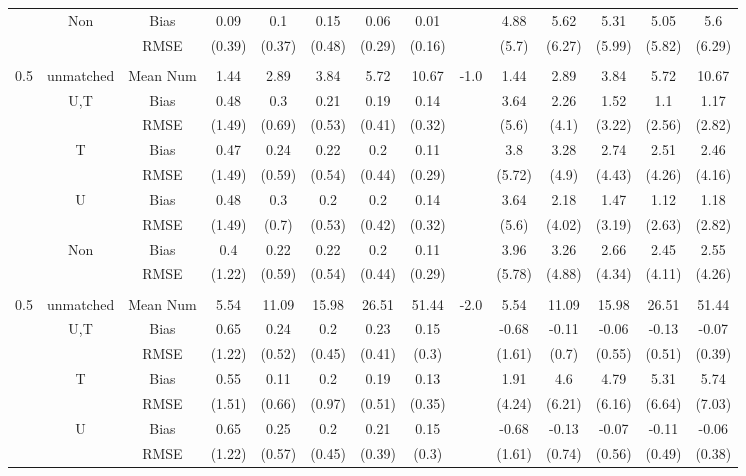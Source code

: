 \begin{tabular}{@{\extracolsep{5pt}}lc|cccccc|lccccc}
 & Non & Bias & 0.09 & 0.1 & 0.15 & 0.06 & 0.01 &  & 4.88 & 5.62 & 5.31 & 5.05 & 5.6 \\
 &  & RMSE & (0.39) & (0.37) & (0.48) & (0.29) & (0.16) &  & (5.7) & (6.27) & (5.99) & (5.82) & (6.29) \\
 &  &  &  &  &  &  &  &  &  &  &  &  &  \\
0.5 & unmatched & Mean Num & 1.44 & 2.89 & 3.84 & 5.72 & 10.67 & -1.0 & 1.44 & 2.89 & 3.84 & 5.72 & 10.67 \\
 & U,T & Bias & 0.48 & 0.3 & 0.21 & 0.19 & 0.14 &  & 3.64 & 2.26 & 1.52 & 1.1 & 1.17 \\
 &  & RMSE & (1.49) & (0.69) & (0.53) & (0.41) & (0.32) &  & (5.6) & (4.1) & (3.22) & (2.56) & (2.82) \\
 & T & Bias & 0.47 & 0.24 & 0.22 & 0.2 & 0.11 &  & 3.8 & 3.28 & 2.74 & 2.51 & 2.46 \\
 &  & RMSE & (1.49) & (0.59) & (0.54) & (0.44) & (0.29) &  & (5.72) & (4.9) & (4.43) & (4.26) & (4.16) \\
 & U & Bias & 0.48 & 0.3 & 0.2 & 0.2 & 0.14 &  & 3.64 & 2.18 & 1.47 & 1.12 & 1.18 \\
 &  & RMSE & (1.49) & (0.7) & (0.53) & (0.42) & (0.32) &  & (5.6) & (4.02) & (3.19) & (2.63) & (2.82) \\
 & Non & Bias & 0.4 & 0.22 & 0.22 & 0.2 & 0.11 &  & 3.96 & 3.26 & 2.66 & 2.45 & 2.55 \\
 &  & RMSE & (1.22) & (0.59) & (0.54) & (0.44) & (0.29) &  & (5.78) & (4.88) & (4.34) & (4.11) & (4.26) \\
 &  &  &  &  &  &  &  &  &  &  &  &  &  \\
0.5 & unmatched & Mean Num & 5.54 & 11.09 & 15.98 & 26.51 & 51.44 & -2.0 & 5.54 & 11.09 & 15.98 & 26.51 & 51.44 \\
 & U,T & Bias & 0.65 & 0.24 & 0.2 & 0.23 & 0.15 &  & -0.68 & -0.11 & -0.06 & -0.13 & -0.07 \\
 &  & RMSE & (1.22) & (0.52) & (0.45) & (0.41) & (0.3) &  & (1.61) & (0.7) & (0.55) & (0.51) & (0.39) \\
 & T & Bias & 0.55 & 0.11 & 0.2 & 0.19 & 0.13 &  & 1.91 & 4.6 & 4.79 & 5.31 & 5.74 \\
 &  & RMSE & (1.51) & (0.66) & (0.97) & (0.51) & (0.35) &  & (4.24) & (6.21) & (6.16) & (6.64) & (7.03) \\
 & U & Bias & 0.65 & 0.25 & 0.2 & 0.21 & 0.15 &  & -0.68 & -0.13 & -0.07 & -0.11 & -0.06 \\
 &  & RMSE & (1.22) & (0.57) & (0.45) & (0.39) & (0.3) &  & (1.61) & (0.74) & (0.56) & (0.49) & (0.38) \\

\end{tabular}
